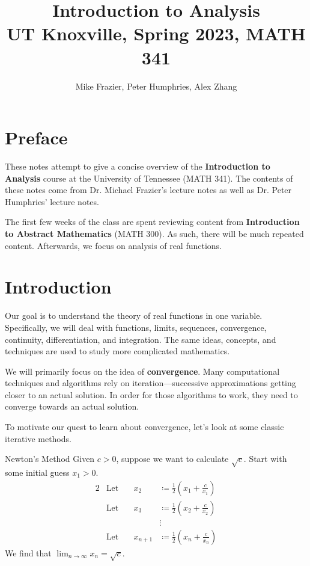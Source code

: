 \documentclass[12pt]{report}
\title{\textbf{Introduction to Analysis}\\
\large UT Knoxville, Spring 2023, MATH 341}
\author{Mike Frazier, Peter Humphries, Alex Zhang}
\begin{document}
\maketitle
\tableofcontents

\chapter*{Preface}
These notes attempt to give a concise overview of the \textbf{Introduction to Analysis} course at the University of Tennessee (MATH 341). The contents of these notes come from Dr. Michael Frazier's lecture notes as well as Dr. Peter Humphries' lecture notes.

The first few weeks of the class are spent reviewing content from \textbf{Introduction to Abstract Mathematics} (MATH 300). As such, there will be much repeated content. Afterwards, we focus on analysis of real functions.

\chapter{Introduction}
Our goal is to understand the theory of real functions in one variable. Specifically, we will deal with functions, limits, sequences, convergence, continuity, differentiation, and integration. The same ideas, concepts, and techniques are used to study more complicated mathematics.

We will primarily focus on the idea of \textbf{convergence}. Many computational techniques and algorithms rely on iteration---successive approximations getting closer to an actual solution. In order for those algorithms to work, they need to converge towards an actual solution.

To motivate our quest to learn about convergence, let's look at some classic iterative methods.

\begin{exbox}{Newton's Method}{}
    Given $c > 0$, suppose we want to calculate $\sqrt{c}$. Start with some initial guess $x_1 > 0$.
    \begin{alignat*}{2}
        & \text{Let}\quad & x_2 &\coloneq \frac{1}{2} \left( x_1 + \frac{c}{x_1} \right) \\
        & \text{Let}\quad & x_3 &\coloneq \frac{1}{2} \left( x_2 + \frac{c}{x_2} \right) \\
        && &\vdots \\
        & \text{Let}\quad & x_{n+1} &\coloneq \frac{1}{2} \left( x_n + \frac{c}{x_n} \right)
    \end{alignat*}
    We find that $\lim_{n\to\infty} x_n = \sqrt{c}$.
\end{exbox}
\end{document}
